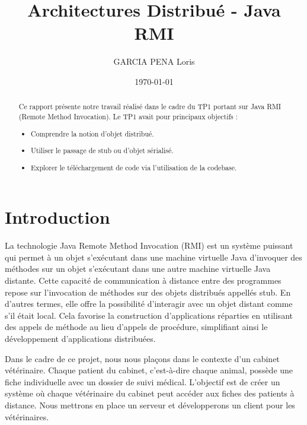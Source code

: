 \documentclass{article} %
\title{Architectures Distribué - Java RMI}
\author{GARCIA PENA Loris}
\date{\today} %
\begin{document}

\maketitle %

\begin{abstract}
    Ce rapport présente notre travail réalisé dans le cadre du TP1 portant sur Java RMI (Remote Method Invocation). Le TP1 avait pour principaux objectifs :

    \begin{itemize}
        \item Comprendre la notion d'objet distribué.
        \item Utiliser le passage de stub ou d'objet sérialisé.
        \item Explorer le téléchargement de code via l'utilisation de la codebase.
    \end{itemize}
\end{abstract}

\tableofcontents

\newpage %

\section{Introduction}

La technologie Java Remote Method Invocation (RMI) est un système puissant qui permet à un objet s'exécutant dans une machine virtuelle
Java d'invoquer des méthodes sur un objet s'exécutant dans une autre machine virtuelle Java distante. Cette capacité de communication à distance
entre des programmes repose sur l'invocation de méthodes sur des objets distribués appellés stub.
En d'autres termes, elle offre la possibilité d'interagir avec un objet distant comme s'il était local.
Cela favorise la construction d'applications réparties en utilisant des appels de méthode au lieu d'appels de procédure,
simplifiant ainsi le développement d'applications distribuées.

Dans le cadre de ce projet, nous nous plaçons dans le contexte d'un cabinet vétérinaire.
Chaque patient du cabinet, c'est-à-dire chaque animal, possède une fiche individuelle avec un dossier de suivi médical.
L'objectif est de créer un système où chaque vétérinaire du cabinet peut accéder aux fiches des patients à distance.
Nous mettrons en place un serveur et développerons un client pour les vétérinaires.
\end{document}
